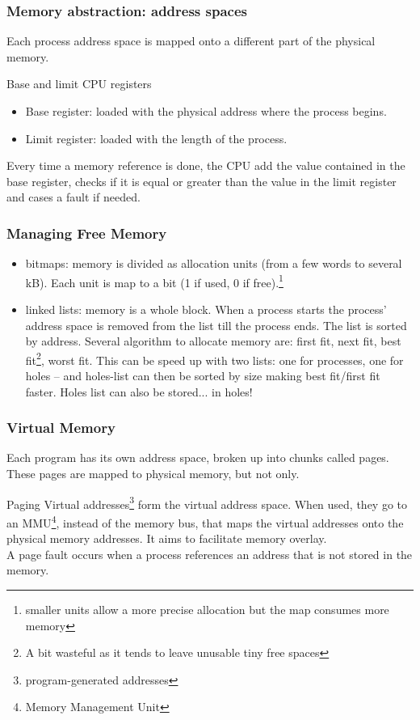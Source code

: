   \begin{frame}
    \frametitle{Memory abstraction: address spaces}
    Each process address space is mapped onto a different part of the physical memory.
    \begin{block}{Base and limit CPU registers}
      \begin{itemize}
        \item Base register: loaded with the physical address where the process begins.
        \item Limit register: loaded with the length of the process.
      \end{itemize}
    \end{block}
    Every time a memory reference is done, the CPU add the value contained in the base register, checks if it is equal or greater than the value in the limit register and cases a fault if needed.
  \end{frame}

  \begin{frame}
    \frametitle{Managing Free Memory}
    \begin{itemize}
      \item bitmaps: memory is divided as allocation units (from a few words to several kB). Each unit is map to a bit (1 if used, 0 if free).\footnote{smaller units allow a more precise allocation but the map consumes more memory}
      \item linked lists: memory is a whole block. When a process starts the process' address space is removed from the list till the process ends. The list is sorted by address. Several algorithm to allocate memory are: first fit, next fit, best fit\footnote{A bit wasteful as it tends to leave unusable tiny free spaces}, worst fit. This can be speed up with two lists: one for processes, one for holes -- and holes-list can then be sorted by size making best fit/first fit faster. Holes list can also be stored... in holes!
    \end{itemize}
  \end{frame}

  \begin{frame}
    \frametitle{Virtual Memory}
    Each program has its own address space, broken up into chunks called pages. These pages are mapped to physical memory, but not only.
    \begin{block}{Paging}
      Virtual addresses\footnote{program-generated addresses} form the virtual address space. When used, they go to an MMU\footnote{Memory Management Unit}, instead of the memory bus, that maps the virtual addresses onto the physical memory addresses. It aims to facilitate memory overlay.\\
      A page fault occurs when a process references an address that is not stored in the memory.
    \end{block}
  \end{frame}

